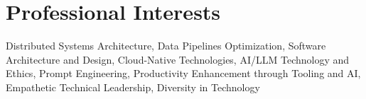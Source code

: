 
\section{Professional Interests}
\footnotesize{
    Distributed Systems Architecture, Data Pipelines Optimization, Software Architecture and Design, Cloud-Native Technologies, AI/LLM Technology and Ethics, Prompt Engineering, Productivity Enhancement through Tooling and AI, Empathetic Technical Leadership, Diversity in Technology
}


